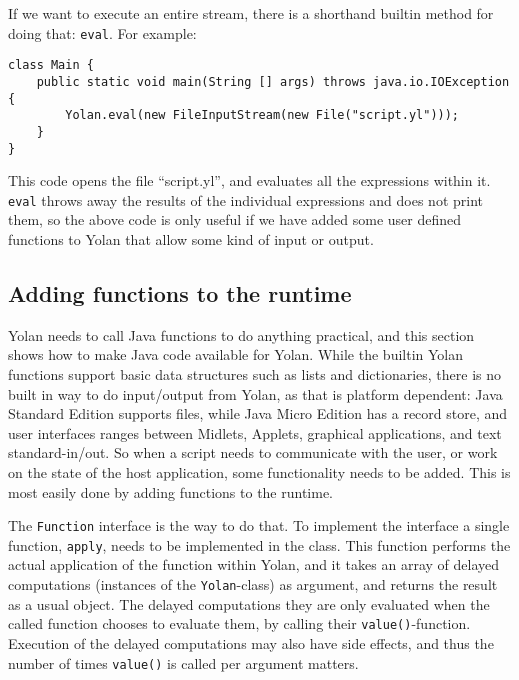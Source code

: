 \documentclass[11pt]{report}
\begin{document}
If we want to execute an entire stream, there is a shorthand builtin method for doing that: \verb|eval|. For example:
\begin{lstlisting}
class Main {
    public static void main(String [] args) throws java.io.IOException {
        Yolan.eval(new FileInputStream(new File("script.yl")));
    }
}
\end{lstlisting}
This code opens the file ``script.yl'', and evaluates all the expressions within it. 
\verb|eval| throws away the results of the individual expressions and does not print them,
so the above code is only useful if we have added some user defined functions to Yolan that allow some kind of input or output.

\subsection{Adding functions to the runtime}
Yolan needs to call Java functions to do anything practical, and this section shows how to make Java code available for Yolan.
While the builtin Yolan functions support basic data structures such as lists and dictionaries,  there is no built in way to do input/output from Yolan, as that is platform dependent: Java Standard Edition supports files, while Java Micro Edition has a record store, and user interfaces ranges between Midlets, Applets, graphical applications, and text standard-in/out.
So when a script needs to communicate with the user, or work on the state of the host application, 
some functionality needs to be added. This is most easily done by adding functions to the runtime.

The \verb|Function| interface is the way to do that. To implement the interface a single function, \verb|apply|, needs to be implemented in the class. 
This function performs the actual application of the function within Yolan, and
it takes an array of delayed computations (instances of the \verb|Yolan|-class) as argument, and returns the result as a usual object.
The delayed computations they are only evaluated when the called function chooses to evaluate them, by calling their \verb|value()|-function.
Execution of the delayed computations may also have side effects, and thus the number of times \verb|value()| is called per argument matters.
\end{document}
